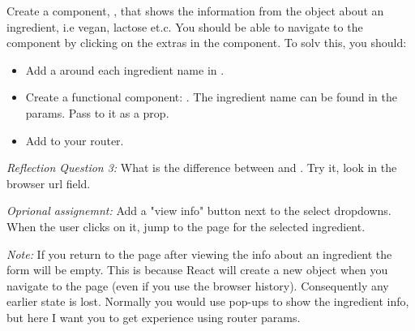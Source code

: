 \documentclass[fleqn, article, a4paper]{memoir}
\begin{document}
\begin{Assignments}
\item Create a component, , that shows the information from the  object about an ingredient, i.e vegan, lactose et.c. You should be able to navigate to the  component by clicking on the extras in the  component. To solv this, you should:

\begin{itemize}
  \item Add a  around each ingredient name in .
  \item Create a functional component: . The ingredient name can be found in the params. Pass  to it as a prop.
  \item Add  to your router.
\end{itemize}

\noindent \emph{Reflection Question 3:} What is the difference between  and . Try it, look in the browser url field.

\emph{Oprional assignemnt:} Add a "view info" button next to the select dropdowns. When the user clicks on it, jump to the  page for the selected ingredient.

\emph{Note:} If you return to the  page after viewing the info about an ingredient the form will be empty. This is because React will create a new  object when you navigate to the page (even if you use the browser history). Consequently any earlier state is lost. Normally you would use pop-ups to show the ingredient info, but here I want you to get experience using router params.


\end{Assignments}
\end{document}
